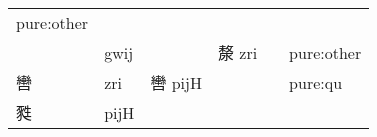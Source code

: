 \documentclass[14pt,a4paper]{scrartcl}
\begin{document}
\begin{longtable}[c]{@{}llllll@{}}
\begin{minipage}[t]{0.14\columnwidth}
pure:other
\strut\end{minipage}\tabularnewline
\begin{minipage}[t]{0.14\columnwidth}\raggedright\strut
𠩺
\strut\end{minipage} &
\begin{minipage}[t]{0.14\columnwidth}\raggedright\strut
gwij
\strut\end{minipage} &
\begin{minipage}[t]{0.14\columnwidth}\raggedright\strut
\strut\end{minipage} &
\begin{minipage}[t]{0.14\columnwidth}\raggedright\strut
漦 zri
\strut\end{minipage} &
\begin{minipage}[t]{0.14\columnwidth}\raggedright\strut
\strut\end{minipage} &
\begin{minipage}[t]{0.14\columnwidth}\raggedright\strut
pure:other
\strut\end{minipage}\tabularnewline
\begin{minipage}[t]{0.14\columnwidth}\raggedright\strut
轡
\strut\end{minipage} &
\begin{minipage}[t]{0.14\columnwidth}\raggedright\strut
zri
\strut\end{minipage} &
\begin{minipage}[t]{0.14\columnwidth}\raggedright\strut
轡 pijH
\strut\end{minipage} &
\begin{minipage}[t]{0.14\columnwidth}\raggedright\strut
\strut\end{minipage} &
\begin{minipage}[t]{0.14\columnwidth}\raggedright\strut
\strut\end{minipage} &
\begin{minipage}[t]{0.14\columnwidth}\raggedright\strut
pure:qu
\strut\end{minipage}\tabularnewline
\begin{minipage}[t]{0.14\columnwidth}\raggedright\strut
甤
\strut\end{minipage} &
\begin{minipage}[t]{0.14\columnwidth}\raggedright\strut
pijH
\strut\end{minipage} &
\begin{minipage}[t]{0.14\columnwidth}\raggedright\strut
\strut\end{minipage} &
\begin{minipage}[t]{0.14\columnwidth}\raggedright\strut

\end{minipage}
\end{longtable}
\end{document}
